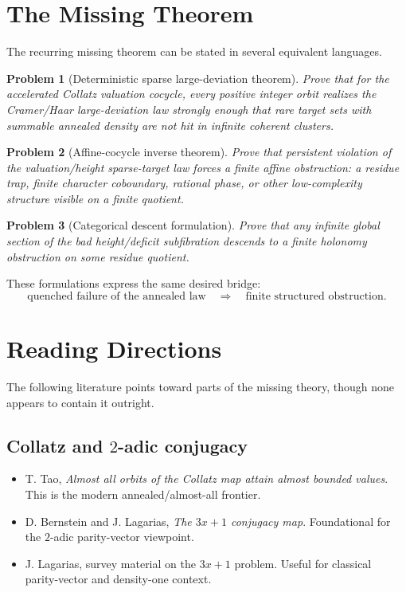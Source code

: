 \documentclass[11pt]{article}
\newtheorem{problem}{Problem}
\begin{document}
\section{The Missing Theorem}

The recurring missing theorem can be stated in several equivalent languages.

\begin{problem}[Deterministic sparse large-deviation theorem]
Prove that for the accelerated Collatz valuation cocycle, every positive integer orbit realizes the Cramer/Haar large-deviation law strongly enough that rare target sets with summable annealed density are not hit in infinite coherent clusters.
\end{problem}

\begin{problem}[Affine-cocycle inverse theorem]
Prove that persistent violation of the valuation/height sparse-target law forces a finite affine obstruction: a residue trap, finite character coboundary, rational phase, or other low-complexity structure visible on a finite quotient.
\end{problem}

\begin{problem}[Categorical descent formulation]
Prove that any infinite global section of the bad height/deficit subfibration descends to a finite holonomy obstruction on some residue quotient.
\end{problem}

These formulations express the same desired bridge:
\[
\text{quenched failure of the annealed law}
\quad\Longrightarrow\quad
\text{finite structured obstruction}.
\]

\section{Reading Directions}

The following literature points toward parts of the missing theory, though none appears to contain it outright.

\subsection{Collatz and $2$-adic conjugacy}
\begin{itemize}[leftmargin=2em]
\item T. Tao, \emph{Almost all orbits of the Collatz map attain almost bounded values}.  This is the modern annealed/almost-all frontier.
\item D. Bernstein and J. Lagarias, \emph{The $3x+1$ conjugacy map}.  Foundational for the $2$-adic parity-vector viewpoint.
\item J. Lagarias, survey material on the $3x+1$ problem.  Useful for classical parity-vector and density-one context.
\end{itemize}
\end{document}

